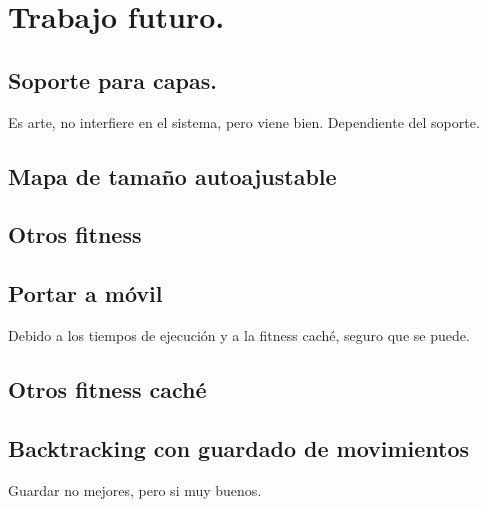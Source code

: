 \chapter{Trabajo futuro.}\label{cap:capitulo7}


\section{Soporte para capas.}

Es arte, no interfiere en el sistema, pero viene bien. Dependiente del soporte.


\section{Mapa de tamaño autoajustable}


\section{Otros fitness}


\section{Portar a móvil}

Debido a los tiempos de ejecución y a la fitness caché, seguro que se puede.

\section{Otros fitness caché}


\section{Backtracking con guardado de movimientos}

Guardar no mejores, pero si muy buenos.

